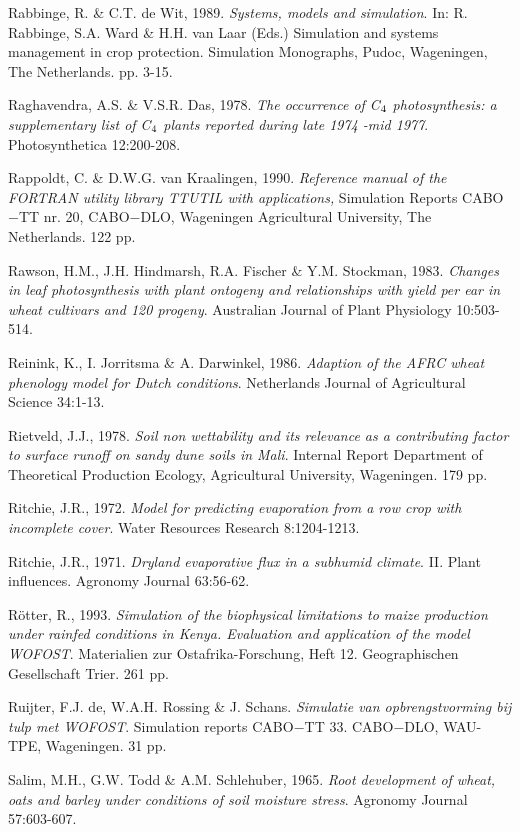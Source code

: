 Rabbinge, R. \& C.T. de Wit, 1989. {\it Systems, models and simulation\/}. In: R. Rabbinge, S.A. Ward
\& H.H. van Laar (Eds.) Simulation and systems management in crop protection. Simulation
Monographs, Pudoc, Wageningen, The Netherlands. pp. 3-15.

Raghavendra, A.S. \& V.S.R. Das, 1978. {\it The occurrence of C$_{{\rm 4}}$ photosynthesis: a supplementary list
of C$_{{\rm 4}}$ plants reported during late 1974 -mid 1977\/}. Photosynthetica 12:200-208.

Rappoldt, C. \& D.W.G. van Kraalingen, 1990. {\it Reference manual of the FORTRAN utility library
TTUTIL with applications,\/} Simulation Reports CABO$-$TT nr. 20, CABO$-$DLO, Wageningen
Agricultural University, The Netherlands. 122 pp. 

Rawson, H.M., J.H. Hindmarsh, R.A. Fischer \& Y.M. Stockman, 1983. {\it Changes in leaf
photosynthesis with plant ontogeny and relationships with yield per ear in wheat cultivars and 120
progeny\/}. Australian Journal of Plant Physiology 10:503-514.

Reinink, K., I. Jorritsma \& A. Darwinkel, 1986. {\it Adaption of the AFRC wheat phenology model for
Dutch conditions\/}. Netherlands Journal of Agricultural Science 34:1-13.

Rietveld, J.J., 1978. {\it Soil non wettability and its relevance as a contributing factor to surface runoff
on sandy dune soils in Mali\/}. Internal Report Department of Theoretical Production Ecology,
Agricultural University, Wageningen. 179 pp.

Ritchie, J.R., 1972. {\it Model for predicting evaporation from a row crop with incomplete cover\/}. Water
Resources Research 8:1204-1213.

Ritchie, J.R., 1971. {\it Dryland evaporative flux in a subhumid climate\/}. II. Plant influences. Agronomy
Journal 63:56-62.

R\"{o}tter, R., 1993. {\it Simulation of the biophysical limitations to maize production under rainfed
conditions in Kenya. Evaluation and application of the model WOFOST\/}. {\nobreak}Materialien zur Ostafrika-Forschung, 
Heft 12. {\nobreak}Geographischen Gesellschaft Trier. 261 pp.

Ruijter, F.J. de, W.A.H. Rossing \& J. Schans. {\it Simulatie van opbrengstvorming bij tulp met
WOFOST\/}. Simula\-tion reports CABO$-$TT 33. CABO$-$DLO, WAU-TPE, Wageningen. 31 pp.

Salim, M.H., G.W. Todd \& A.M. Schlehuber, 1965. {\it Root development of wheat, oats and barley
under conditions of soil moisture stress\/}. Agronomy Journal 57:603-607.

